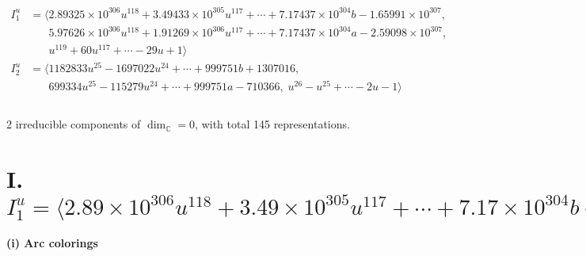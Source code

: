 \documentclass[1p]{elsarticle_modified}
\theoremstyle{definition}
\begin{document}
\begin{align*}
I^u_{1}&=\langle 
2.89325\times10^{306} u^{118}+3.49433\times10^{305} u^{117}+\cdots+7.17437\times10^{304} b-1.65991\times10^{307},\\
\phantom{I^u_{1}}&\phantom{= \langle  }5.97626\times10^{306} u^{118}+1.91269\times10^{306} u^{117}+\cdots+7.17437\times10^{304} a-2.59098\times10^{307},\\
\phantom{I^u_{1}}&\phantom{= \langle  }u^{119}+60 u^{117}+\cdots-29 u+1\rangle \\
I^u_{2}&=\langle 
1182833 u^{25}-1697022 u^{24}+\cdots+999751 b+1307016,\\
\phantom{I^u_{2}}&\phantom{= \langle  }699334 u^{25}-115279 u^{24}+\cdots+999751 a-710366,\;u^{26}- u^{25}+\cdots-2 u-1\rangle \\
\\
\end{align*}
\raggedright * 2 irreducible components of $\dim_{\mathbb{C}}=0$, with total 145 representations.\\
\newpage
\renewcommand{\arraystretch}{1}
\centering \section*{I. $I^u_{1}= \langle 2.89\times10^{306} u^{118}+3.49\times10^{305} u^{117}+\cdots+7.17\times10^{304} b-1.66\times10^{307},\;5.98\times10^{306} u^{118}+1.91\times10^{306} u^{117}+\cdots+7.17\times10^{304} a-2.59\times10^{307},\;u^{119}+60 u^{117}+\cdots-29 u+1 \rangle$}
\flushleft \textbf{(i) Arc colorings}\\
\end{document}
